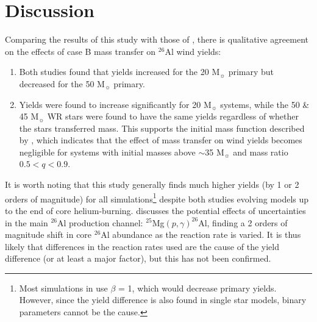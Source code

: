 \section{Discussion} %

Comparing the results of this study with those of \cite{2019ApJ...884...38B}, there is qualitative agreement on the effects of case B mass transfer on $^{26}$Al wind yields:
\begin{enumerate}
    \item Both studies found that yields increased for the 20 M$_{\sun}$ primary but decreased for the 50 M$_{\sun}$ primary.
    \item Yields were found to increase significantly for 20 M$_{\sun}$ systems, while the 50 \& 45 M$_{\sun}$ WR stars were found to have the same yields regardless of whether the stars transferred mass. This supports the initial mass function described by \cite{2019ApJ...884...38B}, which indicates that the effect of mass transfer on wind yields becomes negligible for systems with initial masses above $\sim$35 M$_{\sun}$ and mass ratio $0.5 < q < 0.9$.
\end{enumerate}

It is worth noting that this study generally finds much higher yields (by 1 or 2 orders of magnitude) for all simulations\footnote{Most simulations in \cite{2019ApJ...884...38B} use $\beta$ = 1, which would decrease primary yields. However, since the yield difference is also found in single star models, binary parameters cannot be the cause.} despite both studies evolving models up to the end of core helium-burning.
\cite{2019ApJ...884...38B} discusses the potential effects of uncertainties in the main $^{26}$Al production channel: $^{25}$Mg$(p,\gamma)^{26}$Al, finding a 2 orders of magnitude shift in core $^{26}$Al abundance as the reaction rate is varied.
It is thus likely that differences in the reaction rates used are the cause of the yield difference (or at least a major factor), but this has not been confirmed.

